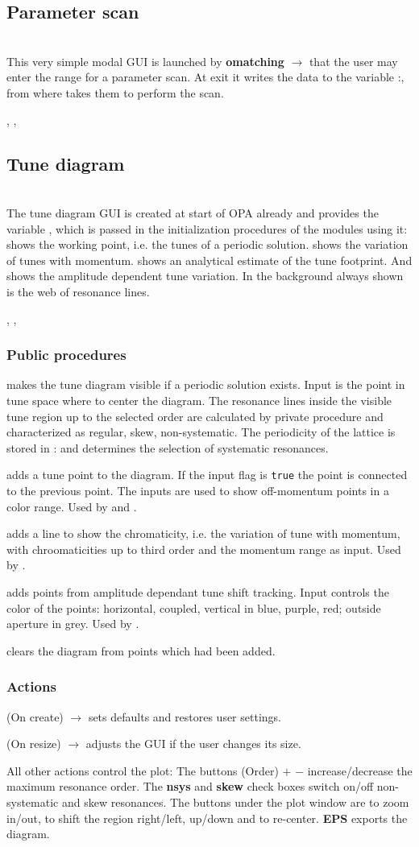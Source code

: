 \documentclass[12pt]{article}
\newcommand\code[1]{{\tt #1}}
\newcommand{\ofld}[1]{\colorbox{black!15}{{\bf #1}}}
\newcommand{\ofldx}[1]{\colorbox{black!15}{(#1)}}
\newcommand\guico[1]{{\color{blue}\code{#1}}}
\newcommand{\unico}[1]{{\color{burntorange}\code{#1}}}
\newcommand{\evcod}[2]{\ofld{#1} $\rightarrow$ \guico{#2}}
\newcommand{\evcodx}[2]{\ofldx{#1} $\rightarrow$ \guico{#2}}
\newcommand{\vrcod}[2]{\opauni{#1}:\unico{#2}}
\newcommand{\opagui}[1]{\colorbox{blue!20}{{\color{black}\code{#1}}}}
\newcommand{\oguih}[2]{\subsection{\label{#2}#1}{\Huge\opagui{#2}}\\}
\newcommand{\ogui}[1]{\hyperref[#1]{\opagui{#1}}}
\newcommand{\opaguif}[1]{\colorbox{violet!30}{{\color{black}\code{#1}}}}
\newcommand{\oguif}[1]{\hyperref[#1]{\opaguif{#1}}}
\newcommand{\opauni}[1]{\colorbox{orange!30}{{\color{black}\code{#1}}}}
\newcommand{\ouni}[1]{\hyperref[#1]{\opauni{#1}}}
\newcommand{\uses}[1]{\flushleft {\bf Uses:} #1}
\newcommand{\desc}[1]{#1}
\newcommand{\act}[1]{\subsubsection*{Actions} #1}
\newcommand{\ppro}[1]{\subsubsection*{Public procedures} #1}
\begin{document}
\oguih{Parameter scan}{omatchscan}

\desc{This very simple modal GUI is launched by \evcod{omatching}{ScanClick} that the user may enter the range for a parameter scan. At exit it writes the data to the variable \vrcod{linoplib}{ScanPar}, from where \ogui{omatching} takes them to perform the scan.}

\uses{\ouni{linoplib}, \ouni{globlib}, \ouni{../com/asaux}} 


\oguih{Tune diagram}{opatunediag}

\desc{The tune diagram GUI is created at start of OPA already and provides the variable \guico{tuneplot}, which is passed in the initialization procedures of the modules using it: \ogui{opalinop} shows the working point, i.e. the tunes of a periodic solution. \ogui{opamomentum} shows the variation of tunes with momentum. \ogui{opachroma} shows an analytical estimate of the tune footprint. And \ogui{opatrackps} shows the amplitude dependent tune variation. In the background always shown is the web of resonance lines.}

\uses{\ouni{globlib}, \oguif{../com/asfigure}, \ouni{../com/asaux}}

\ppro{
\guico{Diagram} makes the tune diagram visible if a periodic solution exists. Input is the point in tune space where to center the diagram.  The resonance lines inside the visible tune region up to the selected order are calculated by private procedure \unico{getLines} and characterized as regular, skew, non-systematic.  The periodicity of the lattice is stored in \vrcod{globlib}{NPer} and determines the selection of systematic resonances. 

\guico{AddTunePoint} adds a tune point to the diagram. If the input flag \guico{connect} is \code{true} the point is connected to the previous point. The inputs \guico{dpp, dppmax} are used to show off-momentum points in a color range. Used by \ogui{opalinop} and \ogui{opamomentum}.

\guico{AddChromLine} adds a line to show the chromaticity, i.e. the variation of tune with momentum, with chroomaticities up to third order and the momentum range as input. Used by \ogui{opachroma}.

\guico{AddTushPoint} adds points from amplitude dependant tune shift tracking. Input \guico{xmy} controls the color of the points: horizontal, coupled, vertical in blue, purple, red; outside aperture in grey. Used by \ogui{opatrackps}.

\guico{Refresh} clears the diagram from points which had been added.
}
\act{
\evcodx{On create}{FormCreate} sets defaults and restores user settings.

\evcodx{On resize}{FormResize} adjusts the GUI if the user changes its size.

All other actions control the plot: The buttons \ofldx{Order} \ofld{$+$} \ofld{$-$} increase/decrease the maximum resonance order. The \ofld{nsys} and \ofld{skew} check boxes switch on/off non-systematic and skew resonances. The buttons under the plot window are to zoom in/out, to shift the region right/left, up/down and to re-center. \ofld{EPS} exports the diagram.
}
\end{document}
